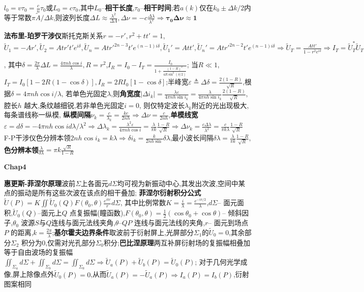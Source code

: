 \documentclass[10pt,a4paper]{article}
\begin{document}
$l_0=v\tau_0=\frac{c}{n}\tau_0$或$L_0=c\tau_0$,其中$L_0$--\textbf{相干长度},$\tau_0$--\textbf{相干时间};若$a(k)$仅在$k_0\pm\Delta k/2$内等于常数$\pi\widetilde{A}/\Delta k$,则波列长度$\Delta L\approx\frac{\lambda^2}{\Delta\Lambda},\Delta\nu=-c\frac{\Delta\lambda}{\lambda^2}\Longrightarrow\bm{\tau_0\Delta\nu\approx1}$

\textbf{法布里-珀罗干涉仪}斯托克斯关系$r=-r',r^2+tt'=1$,$\widetilde{U}_1=-Ar',\widetilde{U}_2=Atr't'e^{i\delta},\widetilde{U}_n=Atr'^{2n-3}t'e^{(n-1)i\delta},\widetilde{U}_1'=Att',\widetilde{U}_n'=Atr'^{2n-2}t'e^{(n-1)i\delta}\Longrightarrow \widetilde{U}_T=\frac{Att'}{1-r^2e^{i\delta}}\Longrightarrow I_T=\widetilde{U}_T^*\widetilde{U}_T=\frac{I_0(1-r^2)^2}{1-2r^2\cos\delta+r^4}=\frac{I_0}{1+\frac{4R\sin^2(\delta/2)}{(1-R)^2}}$, 其中$\delta=\frac{2\pi}{\lambda}\Delta L=\frac{4\pi nh\cos i}{\lambda},R=r^2$,$I_R=I_0-I_T=\frac{I_0}{1+\frac{(1-R)^2}{4R\sin^2(\delta/2)}}$; 当$R\ll1$,$I_T=I_0[1-2R(1-\cos\delta)],I_R=2RI_0[1-\cos\delta]$;半峰宽$\varepsilon\triangleq\Delta\delta=\frac{2(1-R)}{\sqrt{R}}$,根据$\delta=4\pi nh\cos i/\lambda$, 若单色光固定$\lambda$,则\textbf{角宽度}$|\Delta i_k|=\frac{\lambda\varepsilon}{4\pi nh\sin i_k}=\frac{\lambda}{4\pi nh\sin i_k}\frac{2(1-R)}{\sqrt{R}}$,腔长$h$ 越大,条纹越细锐,若非单色光固定$i=0$, 则仅特定波长$\lambda_k$附近的光出现极大,每条谱线称一纵模,
\textbf{纵模间隔}$\nu_k=\frac{c}{\lambda_k}=\frac{kc}{2nh}\Longrightarrow\Delta\nu=\frac{c}{2nh}$,\textbf{单模线宽}$\varepsilon=d\delta=-4\pi nh\cos id\lambda/\lambda^2\Longrightarrow\Delta\lambda_k=\frac{\lambda^2\varepsilon}{4\pi nh\cos i}=\frac{\lambda}{\pi k}\frac{1-R}{\sqrt{R}}\Longrightarrow\Delta\nu_k=\frac{c\Delta\lambda}{\lambda^2}=\frac{c}{\pi k\lambda}\frac{1-R}{\sqrt{R}}$
F-P干涉仪色分辨本领$2nh\cos i_k=k\lambda\Longrightarrow\delta i_k=\frac{k}{2nh\sin}\delta\lambda$,最小波长间隔$\delta\lambda=\frac{\lambda}{\pi k}\frac{1-R}{\sqrt{R}}$,\textbf{色分辨本领}$\frac{\lambda}{\delta\lambda}=\pi k\frac{\sqrt{R}}{1-R}$

\textbf{Chap4}

\textbf{惠更斯-菲涅尔原理}波前$\Sigma$上各面元$d\Sigma$均可视为新振动中心,其发出次波,空间中某点的振动是所有这些次波在该点的相干叠加;
\textbf{菲涅尔衍射积分公式}$\widetilde{U}(P)=K\iint\widetilde{U}_0(Q)F(\theta_0,\theta)\frac{e^{ikr}}{r}d\Sigma$, 其中比例常数$K=\frac{i}{\lambda}=\frac{e^{-i\pi/2}}{\lambda}$,$d\Sigma$-- 面元面积,$\widetilde{U}_0(Q)$--面元上$Q$ 点复振幅(瞳函数),$F(\theta_0,\theta)=\frac{1}{2}(\cos\theta_0+\cos\theta)$-- 倾斜因子,$\theta_0$ 波源$S$与$Q$连线与面元法线夹角,$\theta$--$QP$ 连线与面元法线的夹角,$r$-- 面元到场点$P$ 的距离,$k=\frac{2\pi}{\lambda}$;\textbf{基尔霍夫边界条件}取波前于衍射屏上,光屏部分$\Sigma_1$的$\widetilde{U}_0=0$,其余部分$\Sigma_2$ 积分为$0$,仅需对光孔部分$\Sigma_0$积分;\textbf{巴比涅原理}两互补屏衍射场的复振幅相叠加等于自由波场的复振幅$\iint_{\Sigma_a}d\Sigma+\iint_{\Sigma_b}d\Sigma=\iint_{\Sigma_0}d\Sigma\Longrightarrow\widetilde{U}_a(P)+\widetilde{U}_b(P)=\widetilde{U}_0(P)$; 对于几何光学成像,屏上除像点外$\widetilde{U}_0(P)=0$,从而$\widetilde{U}_a(P)=-\widetilde{U}_a(P)\Longrightarrow I_a(P)=I_b(P)$,衍射图案相同
\end{document}

